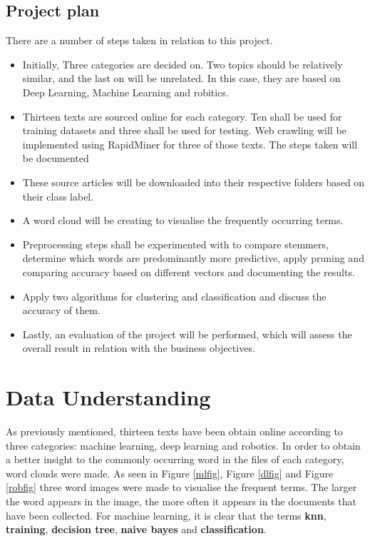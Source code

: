 \subsection*{Project plan}
There are a number of steps taken in relation to this project.
\begin{itemize}
	\item Initially, Three categories are decided on. Two topics should be relatively similar, and the last on will be unrelated. In this case, they are based on Deep Learning, Machine Learning and robitics.
	\item Thirteen texts are sourced online for each category. Ten shall be used for training datasets and three shall be used for testing. Web crawling will be implemented using RapidMiner for three of those texts. The steps taken will be documented 
	\item These source articles will be downloaded into their respective folders based on their class label.
	\item A word cloud will be creating to visualise the frequently occurring terms.
	\item Preprocessing steps shall be experimented with to compare stemmers, determine which words are predominantly more predictive, apply pruning and comparing accuracy based on different vectors and documenting the results.
	\item Apply two algorithms for clustering and classification and discuss the accuracy of them.
	\item Lastly, an evaluation of the project will be performed, which will assess the overall result in relation with the business objectives. 
\end{itemize}


\section*{Data Understanding}

As previously mentioned, thirteen texts have been obtain online according to three categories: machine learning, deep learning and robotics.
In order to obtain a better insight to the commonly occurring word in the files of each category, word clouds were made. As seen in Figure \ref{mlfig}, Figure \ref{dlfig} and Figure \ref{robfig} three word images were made to visualise the frequent terms. The larger the word appears in the image, the more often it appears in the documents that have been collected.
For machine learning, it is clear that the terms \textbf{knn}, \textbf{training}, \textbf{decision tree}, \textbf{naive bayes} and \textbf{classification}.

